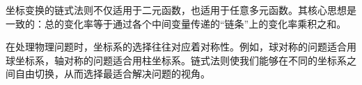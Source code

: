 \documentclass[12pt,UTF8]{ctexbook}
\begin{document}
坐标变换的链式法则不仅适用于二元函数，也适用于任意多元函数。其核心思想是一致的：总的变化率等于通过各个中间变量传递的“链条”上的变化率乘积之和。

在处理物理问题时，坐标系的选择往往对应着对称性。例如，球对称的问题适合用球坐标系，轴对称的问题适合用柱坐标系。链式法则使我们能够在不同的坐标系之间自由切换，从而选择最适合解决问题的视角。




\end{document}
